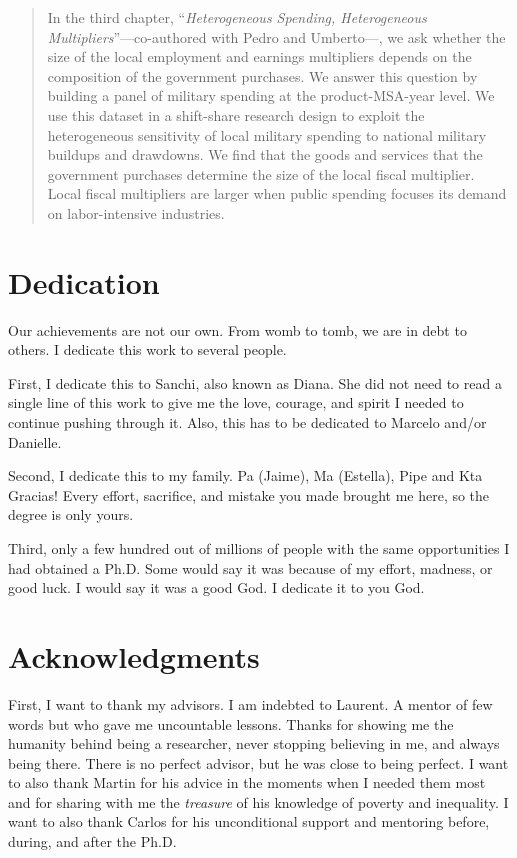 \documentclass[12pt]{report}
\begin{document}
\begin{abstract}
In the third chapter, \enquote{\textit{Heterogeneous Spending, Heterogeneous Multipliers}}---co-authored with Pedro and Umberto---, we ask whether the size of the local employment and earnings multipliers depends on the composition of the government purchases. We answer this question by building a panel of military spending at the product-MSA-year level. We use this dataset in a shift-share research design to exploit the heterogeneous sensitivity of local military spending to national military buildups and drawdowns. We find that the goods and services that the government purchases determine the size of the local fiscal multiplier. Local fiscal multipliers are larger when public spending focuses its demand on labor-intensive industries.


\end{abstract}


\chapter*{Dedication}
Our achievements are not our own. From womb to tomb, we are in debt to others. I dedicate this work to several people.

First, I dedicate this to Sanchi, also known as Diana. She did not need to read a single line of this work to give me the love, courage, and spirit I needed to continue pushing through it. Also, this has to be dedicated to Marcelo and/or Danielle.

Second, I dedicate this to my family. Pa (Jaime), Ma (Estella), Pipe and Kta Gracias! Every effort, sacrifice, and mistake you made brought me here, so the degree is only yours. 

Third, only a few hundred out of millions of people with the same opportunities I had obtained a Ph.D. Some would say it was because of my effort, madness, or good luck. I would say it was a good God. I dedicate it to you God.

\chapter*{Acknowledgments}

First, I want to thank my advisors. I am indebted to Laurent. A mentor of few words but who gave me uncountable lessons. Thanks for showing me the humanity behind being a researcher, never stopping believing in me, and always being there. There is no perfect advisor, but he was close to being perfect. I want to also thank Martin for his advice in the moments when I needed them most and for sharing with me the \textit{treasure} of his knowledge of poverty and inequality. I want to also thank Carlos for his unconditional support and mentoring before, during, and after the Ph.D.
\end{document}

